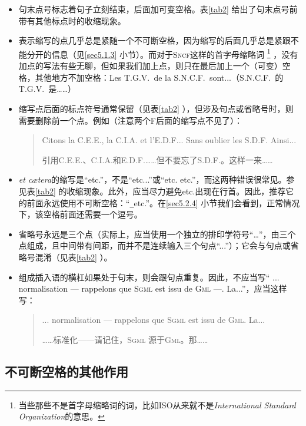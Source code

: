 \begin{itemize}
    \item 句末点号标志着句子立刻结束，后面加可变空格。表\ref{tab2} 给出了句末点号前带有其他标点时的收缩现象。
    \item 表示缩写的点几乎总是紧随一个不可断空格，因为缩写的后面几乎总是紧跟不能分开的信息（见\ref{sec5.1.3} 小节）。而对于\textsc{Sncf}这样的首字母缩略词
    \footnote{当些那些不是首字母缩略词的词，比如ISO从来就不是\emph{International Standard Organization}的意思。}
    ，没有加点的写法有些无聊，但如果我们加上点，则只在最后加上一个（可变）空格，其他地方不加空格：Les T.G.V.\verb*| |de la S.N.C.F.\verb*| |sont...（S.N.C.F.\verb*| |的T.G.V.\verb*| |是……）
    \item 缩写点后面的标点符号通常保留（见表\ref{tab2} ），但涉及句点或省略号时，则需要删除前一个点。例如（注意两个F后面的缩写点不见了）：
    \begin{quote}
        Citons la C.E.E., la C.I.A. et l’E.D.F... Sans oublier les S.D.F. Ainsi...

        \begin{bil}
            引用C.E.E.、C.I.A.和E.D.F.……但不要忘了S.D.F.。这样一来……
        \end{bil}
    \end{quote}
    \item \emph{et cætera}的缩写是“etc.”，不是“etc...”或“etc. etc.”，而这两种错误很常见。参见表\ref{tab2} 的收缩现象。此外，应当尽力避免etc.出现在行首。因此，推荐它的前面永远使用不可断空格：“\verb|_|etc.”。在\ref{sec5.2.4} 小节我们会看到，正常情况下，该空格前面还需要一个逗号。
    \item 省略号永远是三个点（实际上，应当使用一个独立的排印学符号“…”，由三个点组成，且中间带有间距，而并不是连续输入三个句点“...”）；它会与句点或省略号混淆（见表\ref{tab2} ）。
    \item 组成插入语的横杠如果处于句末，则会跟句点重复。因此，不应当写“ ... normalisation --- rappelons que \textsc{Sgml} est issu de \textsc{Gml} ---. La...”，应当这样写：
    \begin{quote}
        ... normalisation --- rappelons que \textsc{Sgml} est issu de \textsc{Gml}. La...
        
        \begin{bil}
            ……标准化——请记住，\textsc{Sgml} 源于\textsc{Gml}。那……
        \end{bil}
    \end{quote}
\end{itemize}

\subsection{不可断空格的其他作用}